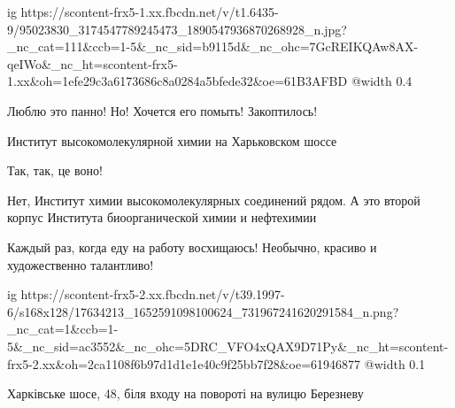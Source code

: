  
 
 
 
 

\ifcmt
  ig https://scontent-frx5-1.xx.fbcdn.net/v/t1.6435-9/95023830_3174547789245473_1890547936870268928_n.jpg?_nc_cat=111&ccb=1-5&_nc_sid=b9115d&_nc_ohc=7GcREIKQAw8AX-qeIWo&_nc_ht=scontent-frx5-1.xx&oh=1efe29c3a6173686c8a0284a5bfede32&oe=61B3AFBD
  @width 0.4
\fi

Люблю это панно! Но! Хочется его помыть! Закоптилось!

Институт высокомолекулярной химии на Харьковском шоссе

Так, так, це воно!

Нет, Институт химии высокомолекулярных соединений рядом. А это второй корпус Института биоорганической химии и нефтехимии

Каждый раз, когда еду на работу восхищаюсь! Необычно, красиво и художественно талантливо!


\ifcmt
  ig https://scontent-frx5-2.xx.fbcdn.net/v/t39.1997-6/s168x128/17634213_1652591098100624_731967241620291584_n.png?_nc_cat=1&ccb=1-5&_nc_sid=ac3552&_nc_ohc=5DRC_VFO4xQAX9D71Py&_nc_ht=scontent-frx5-2.xx&oh=2ca1108f6b97d1d1e1e40c9f25bb7f28&oe=61946877
  @width 0.1
\fi


Харківське шосе, 48, біля входу на повороті на вулицю Березневу
